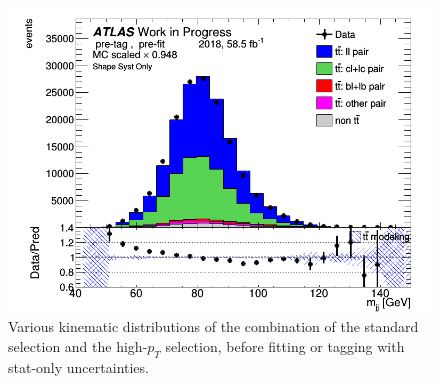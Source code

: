 \documentclass[letterpaper,12pt]{article}
\begin{document}
\begin{figure}[H]
\begin{minipage}[b]{.45\textwidth}
\centering
\includegraphics[width=1\textwidth]{Distribution_March_highpT/DataMC_mjj.png}
\end{minipage}
\caption{Various kinematic distributions of the combination of the standard selection and the high-$p_T$ selection, before fitting or tagging with stat-only uncertainties.} \label{fig:highpT_selection}
\end{figure}

\end{document}
